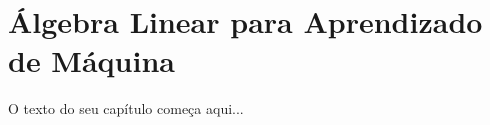 
\chapter{Álgebra Linear para Aprendizado de Máquina}
\label{cap:algebra-linear-ia}

O texto do seu capítulo começa aqui...